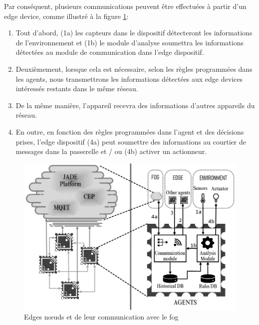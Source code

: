 Par conséquent, plusieurs communications peuvent être effectuées à partir d'un edge device, comme illustré à la figure \ref{archi22}:
\begin{enumerate}
    \item Tout d'abord, (1a) les capteurs dans le dispositif détecteront les informations de l'environnement et (1b) le module d'analyse soumettra les informations détectées au module de communication dans l'edge dispositif.
 \item  Deuxièmement, lorsque cela est nécessaire, selon les règles programmées dans les agents, nous transmettrons les informations détectées aux edge devices  intéressés restants dans le même réseau.
 \item  De la même manière, l'appareil recevra des informations d'autres appareils du réseau.
 \item  En outre, en fonction des règles programmées dans l'agent et des décisions prises, l'edge dispositif (4a) peut soumettre des informations au courtier de messages dans la passerelle et / ou (4b) activer un actionneur.

\end{enumerate}
\begin{figure}[H]
\centering
\includegraphics[scale=1.2]{chap1/archi2.png}
\caption{Edges nœuds et de leur communication avec le fog}
\label{archi22}
\end{figure}

